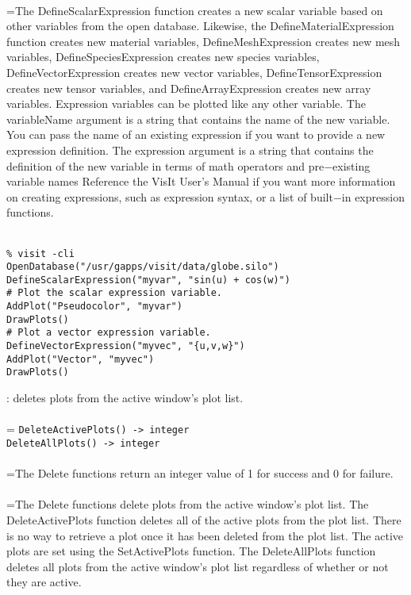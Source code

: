 \documentclass[10pt,a4paper]{report}
\begin{document}
 \\ 
\hangindent=\parindent The DefineScalarExpression function creates a new scalar variable based on other variables from the open database. Likewise, the DefineMaterialExpression function creates new material variables, DefineMeshExpression creates new mesh variables, DefineSpeciesExpression creates new species variables, DefineVectorExpression creates new vector variables, DefineTensorExpression creates new tensor variables, and DefineArrayExpression creates new array variables. Expression variables can be plotted like any other variable. The variableName argument is a string that contains the name of the new variable. You can pass the name of an existing expression if you want to provide a new expression definition. The expression argument is a string that contains the definition of the new variable in terms of math operators and pre$-$existing variable names Reference the VisIt User's Manual if you want more information on  creating expressions, such as expression syntax, or a list of built$-$in expression functions. \\[-3mm] 

\\[-6mm]
\begin{verbatim}% visit -cli
OpenDatabase("/usr/gapps/visit/data/globe.silo")
DefineScalarExpression("myvar", "sin(u) + cos(w)")
# Plot the scalar expression variable.
AddPlot("Pseudocolor", "myvar")
DrawPlots()
# Plot a vector expression variable.
DefineVectorExpression("myvec", "{u,v,w}")
AddPlot("Vector", "myvec")
DrawPlots()
\end{verbatim}
\newpage


{}
: deletes plots from the active window's plot list.\\[-3mm]

 \\ 
\hangindent=\parindent 
\verb!DeleteActivePlots() -> integer!\\ 
\verb!DeleteAllPlots() -> integer!\\ [-3mm]

 \\ 
\hangindent=\parindent The Delete functions return an integer value of 1 for success and 0 for failure. \\[-3mm] 

 \\ 
\hangindent=\parindent The Delete functions delete plots from the active window's plot list. The DeleteActivePlots function deletes all of the active plots from the plot list. There is no way to retrieve a plot once it has been deleted from the plot list. The active plots are set using the SetActivePlots function. The DeleteAllPlots function deletes all plots from the active window's plot list regardless of whether or not they are active. \\[-3mm] 
\end{document}
